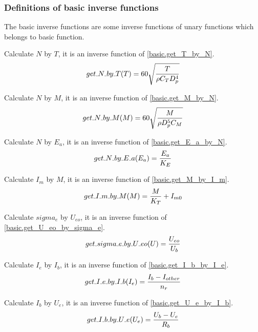 \documentclass{article} %
\numberwithin{equation}{section} %
\newcommand{\SL}{\rule{.3em}{.3pt}} %
\begin{document}
\subsubsection{Definitions of basic inverse functions}\label{main:basic:inverse_functions}
The basic inverse functions are some inverse functions of unary functions which belongs to basic function.

Calculate $N$ by $T$, it is an inverse function of \eqref{basic.get_T_by_N}.
\begin{equation}
get\SL N\SL by\SL T (T) = 60 \sqrt{\frac{T}{\rho C_T D_p^4}} \label{basic.get_N_by_T}
\end{equation}

Calculate $N$ by $M$, it is an inverse function of \eqref{basic.get_M_by_N}.
\begin{equation}
get\SL N\SL by\SL M (M) = 60 \sqrt{\frac{M}{\rho D_p^5 C_M}} \label{basic.get_N_by_M}
\end{equation}

Calculate $N$ by $E_a$, it is an inverse function of \eqref{basic.get_E_a_by_N}.
\begin{equation}
get\SL N\SL by\SL E\SL a (E_a) = \frac{E_a}{K_E} \label{basic.get_N_by_E_a}
\end{equation}

Calculate $I_m$ by $M$, it is an inverse function of \eqref{basic.get_M_by_I_m}.
\begin{equation}
get\SL I\SL m\SL by\SL M (M) = \frac{M}{K_T}+{I_{m0}} \label{basic.get_I_m_by_M}
\end{equation}

Calculate $sigma_e$ by $U_{eo}$, it is an inverse function of \eqref{basic.get_U_eo_by_sigma_e}.
\begin{equation}
get\SL sigma\SL e\SL by\SL U\SL eo (U) = \frac{U_{eo}}{U_b} \label{basic.get_sigma_e_by_U_eo}
\end{equation}

Calculate $I_e$ by $I_b$, it is an inverse function of \eqref{basic.get_I_b_by_I_e}.
\begin{equation}
get\SL I\SL e\SL by\SL I\SL b (I_e) = \frac{I_b - I_{other}}{n_r} \label{basic.get_I_e_by_I_b}
\end{equation}

Calculate $I_b$ by $U_e$, it is an inverse function of \eqref{basic.get_U_e_by_I_b}.
\begin{equation}
get\SL I\SL b\SL by\SL U\SL e (U_e) = \frac{U_b - U_e}{R_b} \label{basic.get_I_b_by_U_e}
\end{equation}
\end{document}
